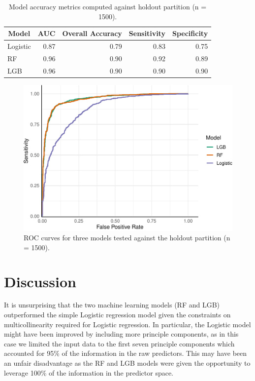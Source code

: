 \documentclass[]{elsarticle} %
\begin{document}
\begin{table}

\caption{\label{tab:metrics}Model accuracy metrics computed against holdout partition (n = 1500).}
\centering
\fontsize{12}{14}\selectfont
\begin{tabular}[t]{lrrrr}
\toprule
\multicolumn{1}{c}{Model} & \multicolumn{1}{c}{AUC} & \multicolumn{1}{c}{Overall Accuracy} & \multicolumn{1}{c}{Sensitivity} & \multicolumn{1}{c}{Specificity}\\
\midrule
Logistic & 0.87 & 0.79 & 0.83 & 0.75\\
\addlinespace
RF & 0.96 & 0.90 & 0.92 & 0.89\\
\addlinespace
LGB & 0.96 & 0.90 & 0.90 & 0.90\\
\bottomrule
\end{tabular}
\end{table}

\begin{figure}
\includegraphics[width=1\linewidth]{report_files/figure-latex/roc-1} \caption{ROC curves for three models tested against the holdout partition (n = 1500).}\label{fig:roc}
\end{figure}

\hypertarget{discussion}{%
\section{Discussion}\label{discussion}}

It is unsurprising that the two machine learning models (RF and LGB)
outperformed the simple Logistic regression model given the constraints
on multicollinearity required for Logistic regression.
In particular, the Logistic model might have been improved by including more
principle components, as in this case we limited the input data to the first
seven principle components which accounted for 95\% of the information in the
raw predictors.
This may have been an unfair disadvantage as the RF and LGB models were given
the opportunity to leverage 100\% of the information in the predictor space.
\end{document}

